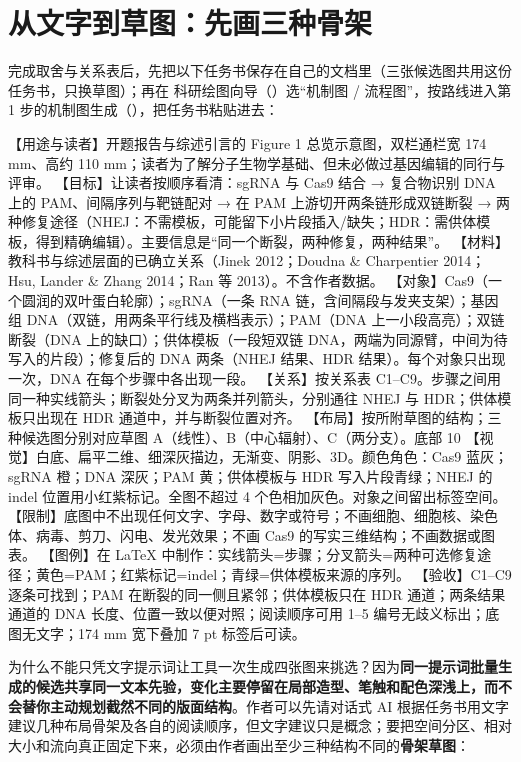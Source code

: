\section{从文字到草图：先画三种骨架}

完成取舍与关系表后，先把以下任务书保存在自己的文档里（三张候选图共用这份任务书，只换草图）；再在 \scidraw{} 科研绘图向导（）选“机制图 / 流程图”，按路线进入第 1 步的机制图生成（），把任务书粘贴进去：

\begin{Prompt}
【用途与读者】开题报告与综述引言的 Figure 1 总览示意图，双栏通栏宽 174 mm、高约 110 mm；读者为了解分子生物学基础、但未必做过基因编辑的同行与评审。
【目标】让读者按顺序看清：sgRNA 与 Cas9 结合 → 复合物识别 DNA 上的 PAM、间隔序列与靶链配对 → 在 PAM 上游切开两条链形成双链断裂 → 两种修复途径（NHEJ：不需模板，可能留下小片段插入/缺失；HDR：需供体模板，得到精确编辑）。主要信息是“同一个断裂，两种修复，两种结果”。
【材料】教科书与综述层面的已确立关系（Jinek 2012；Doudna & Charpentier 2014；Hsu, Lander & Zhang 2014；Ran 等 2013）。不含作者数据。
【对象】Cas9（一个圆润的双叶蛋白轮廓）；sgRNA（一条 RNA 链，含间隔段与发夹支架）；基因组 DNA（双链，用两条平行线及横档表示）；PAM（DNA 上一小段高亮）；双链断裂（DNA 上的缺口）；供体模板（一段短双链 DNA，两端为同源臂，中间为待写入的片段）；修复后的 DNA 两条（NHEJ 结果、HDR 结果）。每个对象只出现一次，DNA 在每个步骤中各出现一段。
【关系】按关系表 C1–C9。步骤之间用同一种实线箭头；断裂处分叉为两条并列箭头，分别通往 NHEJ 与 HDR；供体模板只出现在 HDR 通道中，并与断裂位置对齐。
【布局】按所附草图的结构；三种候选图分别对应草图 A（线性）、B（中心辐射）、C（两分支）。底部 10%
【视觉】白底、扁平二维、细深灰描边，无渐变、阴影、3D。颜色角色：Cas9 蓝灰；sgRNA 橙；DNA 深灰；PAM 黄；供体模板与 HDR 写入片段青绿；NHEJ 的 indel 位置用小红紫标记。全图不超过 4 个色相加灰色。对象之间留出标签空间。
【限制】底图中不出现任何文字、字母、数字或符号；不画细胞、细胞核、染色体、病毒、剪刀、闪电、发光效果；不画 Cas9 的写实三维结构；不画数据或图表。
【图例】在 LaTeX 中制作：实线箭头=步骤；分叉箭头=两种可选修复途径；黄色=PAM；红紫标记=indel；青绿=供体模板来源的序列。
【验收】C1–C9 逐条可找到；PAM 在断裂的同一侧且紧邻；供体模板只在 HDR 通道；两条结果通道的 DNA 长度、位置一致以便对照；阅读顺序可用 1–5 编号无歧义标出；底图无文字；174 mm 宽下叠加 7 pt 标签后可读。
\end{Prompt}

为什么不能只凭文字提示词让工具一次生成四张图来挑选？因为\textbf{同一提示词批量生成的候选共享同一文本先验，变化主要停留在局部造型、笔触和配色深浅上，而不会替你主动规划截然不同的版面结构}。作者可以先请对话式 AI 根据任务书用文字建议几种布局骨架及各自的阅读顺序，但文字建议只是概念；要把空间分区、相对大小和流向真正固定下来，必须由作者画出至少三种结构不同的\textbf{骨架草图}：

